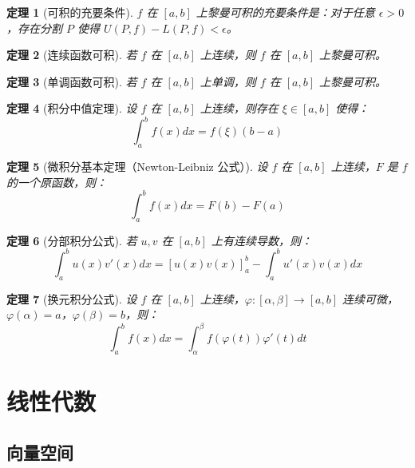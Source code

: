 \documentclass[12pt]{article}
\newtheorem{theorem}{定理}[section]
\begin{document}
\begin{theorem}[可积的充要条件]
$f$ 在 $[a, b]$ 上黎曼可积的充要条件是：对于任意 $\epsilon > 0$，存在分割 $P$ 使得 $U(P, f) - L(P, f) < \epsilon$。
\end{theorem}

\begin{theorem}[连续函数可积]
若 $f$ 在 $[a, b]$ 上连续，则 $f$ 在 $[a, b]$ 上黎曼可积。
\end{theorem}

\begin{theorem}[单调函数可积]
若 $f$ 在 $[a, b]$ 上单调，则 $f$ 在 $[a, b]$ 上黎曼可积。
\end{theorem}

\begin{theorem}[积分中值定理]
设 $f$ 在 $[a, b]$ 上连续，则存在 $\xi \in [a, b]$ 使得：
$$\int_a^b f(x) dx = f(\xi)(b - a)$$
\end{theorem}

\begin{theorem}[微积分基本定理（Newton-Leibniz 公式）]
设 $f$ 在 $[a, b]$ 上连续，$F$ 是 $f$ 的一个原函数，则：
$$\int_a^b f(x) dx = F(b) - F(a)$$
\end{theorem}

\begin{theorem}[分部积分公式]
若 $u, v$ 在 $[a, b]$ 上有连续导数，则：
$$\int_a^b u(x) v'(x) dx = [u(x)v(x)]_a^b - \int_a^b u'(x) v(x) dx$$
\end{theorem}

\begin{theorem}[换元积分公式]
设 $f$ 在 $[a, b]$ 上连续，$\varphi: [\alpha, \beta] \to [a, b]$ 连续可微，$\varphi(\alpha) = a$，$\varphi(\beta) = b$，则：
$$\int_a^b f(x) dx = \int_\alpha^\beta f(\varphi(t)) \varphi'(t) dt$$
\end{theorem}


\section{线性代数}

\subsection{向量空间}
\end{document}
